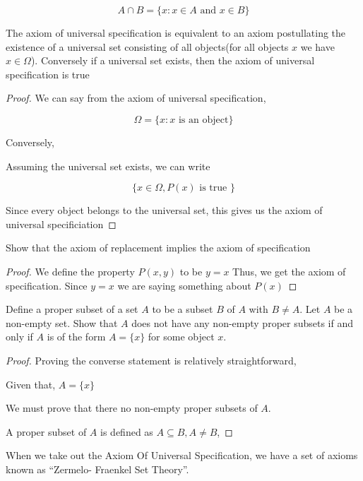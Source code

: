 \documentclass[11pt]{report}
\begin{document}
\begin{definition}
	$$A \cap B = \{x: x \in A \text{ and } x \in B \}$$
\end{definition}

\begin{prop}
	The axiom of universal specification is equivalent to an axiom postullating the existence of a universal set consisting of all objects(for all objects $x$ we have $x \in \Omega$). Conversely if a universal set exists, then the axiom of universal specification is true
\end{prop}
\begin{proof}
	We can say from the axiom of universal specification,

	\[
		\Omega = \{ x : x \text{ is an object}\}
	\]

	Conversely,

	Assuming the universal set exists, we can write

	\[
		\{x \in \Omega, P(x) \text{ is true }\}
	\]

	Since every object belongs to the universal set, this gives us the axiom of universal specificiation
\end{proof}

\begin{prop}
	Show that the axiom of replacement implies the axiom of specification
\end{prop}
\begin{proof}
	We define the property $P(x,y)$ to be $y=x$ Thus, we get the axiom of specification.
	Since $y=x$ we are saying something about $P(x)$
\end{proof}
\begin{prop}
	Define a proper subset of a set $A$ to be a subset $B$ of $A$ with $B \neq A$. Let $A$ be a non-empty set. Show that $A$ does not have any non-empty proper subsets if and only if $A$ is of the form $A = \{x\}$ for some object $x$.
\end{prop}
\begin{proof}

	Proving the converse statement is relatively straightforward,

	Given that,
	$A = \{x\}$

	We must prove that there no non-empty proper subsets of $A$.

	A proper subset of $A$ is defined as $A \subseteq B, A \neq B$,


\end{proof}

When we take out the Axiom Of Universal Specification, we have a set of axioms known as ``Zermelo- Fraenkel Set Theory''.
\end{document}
